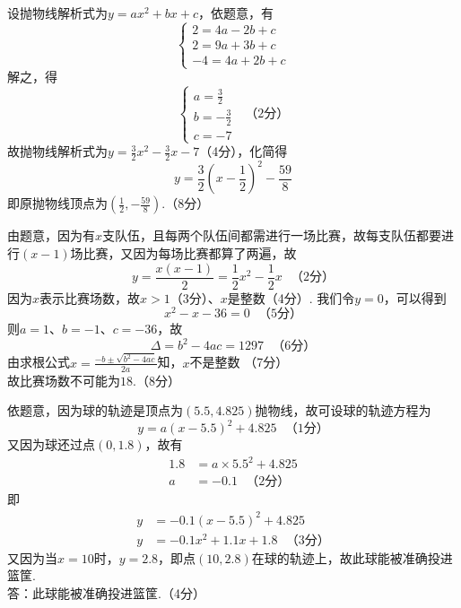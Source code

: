 \documentclass[10pt]{article}
\begin{document}
\setcounter{taskcounter}{16}
\begin{questions}{\answeringintroduction}
    \question 设抛物线解析式为$y=ax^2+bx+c$，依题意，有
    $$\begin{cases}
        2 = 4a - 2b + c \\
        2 = 9a + 3b + c \\
        -4 = 4a + 2b + c
    \end{cases}$$
    解之，得
    $$\begin{cases}
        a = \frac{3}{2} \\
        b = -\frac{3}{2} \\
        c = -7
    \end{cases} \ \ \ （2分）$$
    故抛物线解析式为$y=\frac{3}{2}x^2-\frac{3}{2}x-7$（4分），化简得
    $$y=\frac{3}{2}\left(x-\frac{1}{2}\right)^2-\frac{59}{8}$$
    即原抛物线顶点为$\left(\frac{1}{2},-\frac{59}{8}\right)$.（8分）
    \question %
    \begin{subquestions}
        \subquestion 由题意，因为有$x$支队伍，且每两个队伍间都需进行一场比赛，故每支队伍都要进行$(x-1)$场比赛，又因为每场比赛都算了两遍，故
        $$y=\frac{x(x-1)}{2}=\frac{1}{2}x^2-\frac{1}{2}x \ \ \ （2分）$$
        因为$x$表示比赛场数，故$x > 1$（3分）、$x$是整数（4分）.
        \subquestion 我们令$y=0$，可以得到
        $$x^2-x-36=0 \ \ \ （5分）$$
        则$a=1、b=-1、c=-36$，故
        $$\Delta = b^2-4ac = 1297 \ \ \ （6分）$$
        由求根公式$x=\frac{-b \pm \sqrt{b^2-4ac}}{2a}$知，$x$不是整数 （7分）\\
        故比赛场数不可能为$18$.（8分）
    \end{subquestions}
    \question %
    \begin{subquestions}
        \subquestion 依题意，因为球的轨迹是顶点为$(5.5,4.825)$抛物线，故可设球的轨迹方程为$$y=a(x-5.5)^2+4.825 \ \ \ （1分）$$
        又因为球还过点$(0,1.8)$，故有
        $$\begin{aligned}
            1.8 &= a \times {5.5}^2+4.825 \\
            a &= -0.1 \ \ \ （2分）
        \end{aligned}$$
        即
        $$\begin{aligned}
            y &= -0.1(x-5.5)^2+4.825 \\
            y &= -0.1x^2+1.1x+1.8 \ \ \ （3分）
        \end{aligned}$$
        又因为当$x=10$时，$y=2.8$，即点$(10,2.8)$在球的轨迹上，故此球能被准确投进篮筐.\\
        答：此球能被准确投进篮筐.（4分）

\end{subquestions}
\end{questions}
\end{document}
